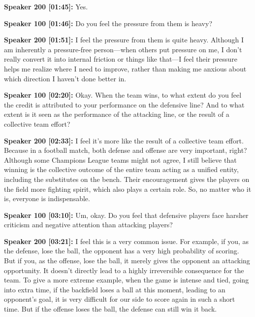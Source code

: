 \documentclass[11pt,a4paper]{article}
\begin{document}
\begin{linenumbers}
\vspace{0.5em}
\noindent \textbf{Speaker 200 [01:45]:} Yes. 

\vspace{0.5em}
\noindent \textbf{Speaker 100 [01:46]:} Do you feel the pressure from them is heavy? 

\vspace{0.5em}
\noindent \textbf{Speaker 200 [01:51]:} I feel the pressure from them is quite heavy. Although I am inherently a pressure-free person—when others put pressure on me, I don't really convert it into internal friction or things like that—I feel their pressure helps me realize where I need to improve, rather than making me anxious about which direction I haven't done better in. 

\vspace{0.5em}
\noindent \textbf{Speaker 100 [02:20]:} Okay. When the team wins, to what extent do you feel the credit is attributed to your performance on the defensive line? And to what extent is it seen as the performance of the attacking line, or the result of a collective team effort? 

\vspace{0.5em}
\noindent \textbf{Speaker 200 [02:33]:} I feel it's more like the result of a collective team effort. Because in a football match, both defense and offense are very important, right? Although some Champions League teams might not agree, I still believe that winning is the collective outcome of the entire team acting as a unified entity, including the substitutes on the bench. Their encouragement gives the players on the field more fighting spirit, which also plays a certain role. So, no matter who it is, everyone is indispensable. 

\vspace{0.5em}
\noindent \textbf{Speaker 100 [03:10]:} Um, okay. Do you feel that defensive players face harsher criticism and negative attention than attacking players? 

\vspace{0.5em}
\noindent \textbf{Speaker 200 [03:21]:} I feel this is a very common issue. For example, if you, as the defense, lose the ball, the opponent has a very high probability of scoring. But if you, as the offense, lose the ball, it merely gives the opponent an attacking opportunity. It doesn't directly lead to a highly irreversible consequence for the team. To give a more extreme example, when the game is intense and tied, going into extra time, if the backfield loses a ball at this moment, leading to an opponent's goal, it is very difficult for our side to score again in such a short time. But if the offense loses the ball, the defense can still win it back. 


\end{linenumbers}
\end{document}
